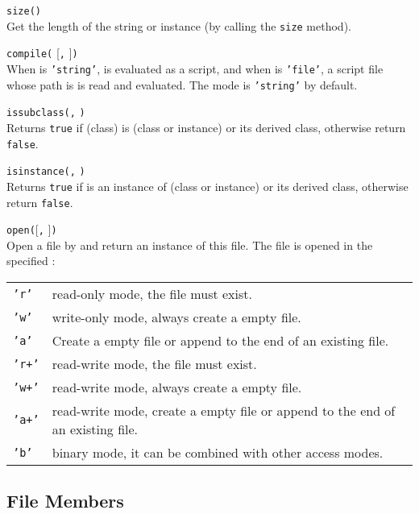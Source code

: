 \hangpar \texttt{size(}\texttt{)}\\
Get the length of the string or instance (by calling the \texttt{size} method).

\hangpar \texttt{compile(} [\texttt{,} ]\texttt{)}\\
When  is \texttt{'string'},  is evaluated as a script, and when  is \texttt{'file'}, a script file whose path is  is read and evaluated. The mode is \texttt{'string'} by default.

\hangpar \texttt{issubclass(}\texttt{,} \texttt{)}\\
Returns \texttt{true} if  (class) is  (class or instance) or its derived class, otherwise return \texttt{false}.

\hangpar \texttt{isinstance(}\texttt{,} \texttt{)}\\
Returns \texttt{true} if  is an instance of  (class or instance) or its derived class, otherwise return \texttt{false}.

\hangpar \texttt{open(}[\texttt{,} ]\texttt{)}\\
Open a file by  and return an instance of this file. The file is opened in the specified :\\
\begin{tabular}{@{}lp{}}
    \texttt{'r'} & \textsf{read}-only mode, the file must exist. \\
    \texttt{'w'} & \textsf{write}-only mode, always create a empty file. \\
    \texttt{'a'} & Create a empty file or \textsf{append} to the end of an existing file. \\
    \texttt{'r+'} & \textsf{read}-\textsf{write} mode, the file must exist. \\
    \texttt{'w+'} & \textsf{read}-\textsf{write} mode, always create a empty file. \\
    \texttt{'a+'} & \textsf{read}-\textsf{write} mode, create a empty file or \textsf{append} to the end of an existing file. \\
    \texttt{'b'} & \textsf{binary} mode, it can be combined with other access modes. \\
\end{tabular}

\subsection*{File Members}


